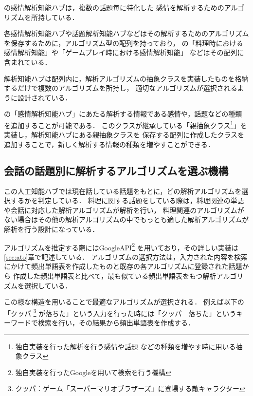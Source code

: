 
の感情解析知能ハブは，複数の話題毎に特化した
感情を解析するためのアルゴリズムを所持している．

各感情解析知能ハブや話題解析知能ハブなどはその解析するためのアルゴリズムを保存するために，アルゴリズム型の配列を持っており，
の「料理時における感情解析知能」や「ゲームプレイ時における感情解析知能」
などはその配列に含まれている．

解析知能ハブは配列内に，解析アルゴリズムの抽象クラスを実装したものを格納するだけで複数のアルゴリズムを所持し，
適切なアルゴリズムが選択されるように設計されている．

の「感情解析知能ハブ」にあたる解析する情報である感情や，話題などの種類
を追加することが可能である．
このクラスが継承している「親抽象クラス\footnote{独自実装を行った解析を行う感情や話題
などの種類を増やす時に用いる抽象クラス}」を実装し，解析知能ハブにある親抽象クラスを
保存する配列に作成したクラスを追加することで，新しく解析する情報の種類を増やすことができる．

\subsection{会話の話題別に解析するアルゴリズムを選ぶ機構}
この人工知能ハブでは現在話している話題をもとに，どの解析アルゴリズムを選択するかを判定している．
料理に関する話題をしている際は，料理関連の単語や会話に対応した解析アルゴリズムが解析を行い，
料理関連のアルゴリズムがない場合はその他の解析アルゴリズムの中でもっとも適した解析アルゴリズムが解析を行う設計になっている．

アルゴリズムを推定する際にはGoogleAPI\footnote{独自実装を行ったGoogleを用いて検索を行う機構}
を用いており，その詳しい実装は\ref{sec:ato}章で記述している．
アルゴリズムの選択方法は，入力された内容を検索にかけて頻出単語表を作成したものと既存の各アルゴリズムに登録された話題から
作成した頻出単語表と比べて，最も似ている頻出単語表をもつ解析アルゴリズムを選択している．

この様な構造を用いることで最適なアルゴリズムが選択される．
例えば以下の「クッパ
	\footnote{クッパ：ゲーム「スーパーマリオブラザーズ」に登場する敵キャラクター}
が落ちた」という入力を行った時には「クッパ　落ちた」というキーワードで検索を行い，その結果から頻出単語表を作成する．


